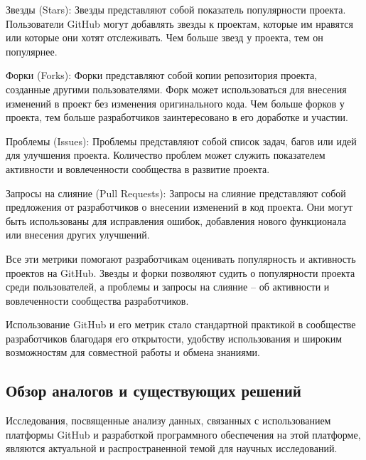\begin{enumerateparendot}
    \item Звезды (Stars): Звезды представляют собой показатель популярности проекта. Пользователи GitHub могут добавлять звезды к проектам, которые им нравятся или которые они хотят отслеживать. Чем больше звезд у проекта, тем он популярнее.

    \item Форки (Forks): Форки представляют собой копии репозитория проекта, созданные другими пользователями. Форк может использоваться для внесения изменений в проект без изменения оригинального кода. Чем больше форков у проекта, тем больше разработчиков заинтересовано в его доработке и участии.

    \item Проблемы (Issues): Проблемы представляют собой список задач, багов или идей для улучшения проекта. Количество проблем может служить показателем активности и вовлеченности сообщества в развитие проекта.

    \item Запросы на слияние (Pull Requests): Запросы на слияние представляют собой предложения от разработчиков о внесении изменений в код проекта. Они могут быть использованы для исправления ошибок, добавления нового функционала или внесения других улучшений.
\end{enumerateparendot}

Все эти метрики помогают разработчикам оценивать популярность и активность проектов на GitHub. Звезды и форки позволяют судить о популярности проекта среди пользователей, а проблемы и запросы на слияние -- об активности и вовлеченности сообщества разработчиков.

Использование GitHub и его метрик стало стандартной практикой в сообществе разработчиков благодаря его открытости, удобству использования и широким возможностям для совместной работы и обмена знаниями.
\vspace{1em}

\subsection{Обзор аналогов и существующих решений}
\label{subsec:Analogues}

Исследования, посвященные анализу данных, связанных с использованием платформы GitHub и разработкой программного обеспечения на этой платформе, являются актуальной и распространенной темой для научных исследований.

